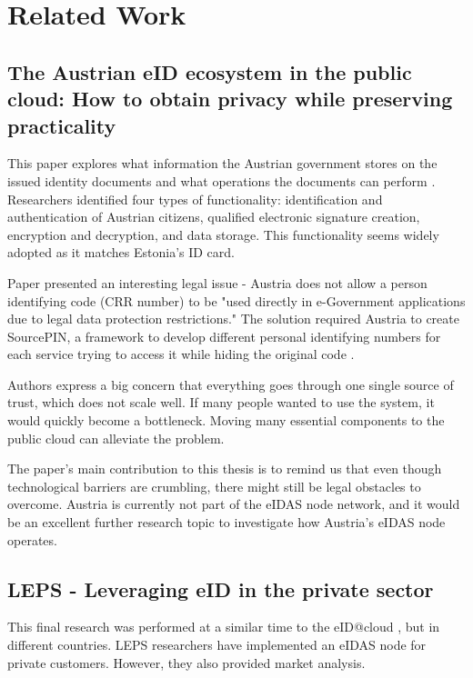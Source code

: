 \section{Related Work}

\subsection{The Austrian eID ecosystem in the public cloud: How to obtain privacy while preserving practicality}

This paper explores what information the Austrian government stores on the issued identity documents and what operations the documents can perform \cite{ZWATTENDORFER201635}. Researchers identified four types of functionality: identification and authentication of Austrian citizens, qualified electronic signature creation, encryption and decryption, and data storage. This functionality seems widely adopted as it matches Estonia's ID card.

Paper presented an interesting legal issue - Austria does not allow a person identifying code (CRR number) to be "used directly in e-Government applications due to legal data protection restrictions." The solution required Austria to create SourcePIN, a framework to develop different personal identifying numbers for each service trying to access it while hiding the original code \cite{ZWATTENDORFER201635,austria-eid-presentation}.

Authors express a big concern that everything goes through one single source of trust, which does not scale well. If many people wanted to use the system, it would quickly become a bottleneck. Moving many essential components to the public cloud can alleviate the problem.

The paper's main contribution to this thesis is to remind us that even though technological barriers are crumbling, there might still be legal obstacles to overcome. Austria is currently not part of the eIDAS node network, and it would be an excellent further research topic to investigate how Austria's eIDAS node operates.

\subsection{LEPS - Leveraging eID in the private sector}

This final research \cite{Martin2019303} was performed at a similar time to the eID@cloud \cite{guerola2019eid}, but in different countries. LEPS researchers 
have implemented an eIDAS node for private customers. However, they also provided market analysis.

